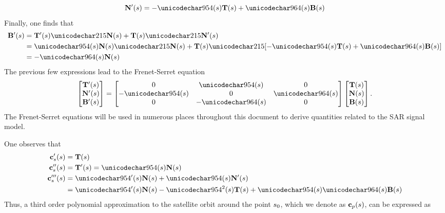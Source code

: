 \begin{equation}
 \vct{N}'(\parm) = -\kappa(\parm)\vct{T}(\parm)+\tau(\parm)\vct{B}(\parm)
\end{equation}
Finally, one finds that
\begin{equation}
\begin{split}
 \vct{B}'(\parm) &= \vct{T}'(\parm)\times\vct{N}(\parm) + \vct{T}(\parm)\times\vct{N}'(\parm)\\
 &=\kappa(\parm)\vct{N}(\parm)\times\vct{N}(\parm) + \vct{T}(\parm)\times[-\kappa(\parm)\vct{T}(\parm)+\tau(\parm)\vct{B}(\parm)]\\
 &=-\tau(\parm)\vct{N}(\parm)
 \end{split}
\end{equation}
The previous few expressions lead to the Frenet-Serret equation
\begin{equation}
 \begin{bmatrix}\vct{T}'(\parm)\\\vct{N}'(\parm)\\\vct{B}'(\parm)\end{bmatrix}
 =
 \begin{bmatrix}
  0 &\kappa(\parm)& 0\\
  -\kappa(\parm)& 0 &\tau(\parm)\\
  0 &-\tau(\parm)& 0
 \end{bmatrix}
 \begin{bmatrix}\vct{T}(\parm)\\\vct{N}(\parm)\\\vct{B}(\parm)\end{bmatrix}.
 \label{eq:FrenetSerret}
\end{equation}
The Frenet-Serret equations will be used in numerous places throughout this document to derive quantities related to the SAR signal model.
\par
One observes that
\begin{equation}
\begin{split}
 \sats'(\parm) &= \vct{T}(\parm)\\
 \sats''(\parm) &= \vct{T}'(\parm) = \kappa(\parm)\vct{N}(\parm)\\
 \sats'''(\parm) &= \kappa'(\parm)\vct{N}(\parm) + \kappa(\parm)\vct{N}'(\parm)\\
 &= \kappa'(\parm)\vct{N}(\parm) -\kappa^2(\parm)\vct{T}(\parm)+\kappa(\parm)\tau(\parm)\vct{B}(\parm)
\end{split}
\end{equation}
Thus, a third order polynomial approximation to the satellite orbit around the point $s_0$, which we denote as $\mathbf{c}_p(s)$, can be expressed as

